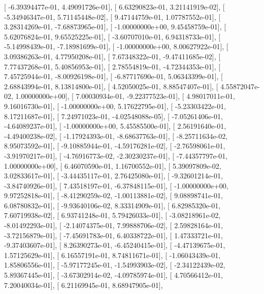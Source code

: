 \documentclass{article}
\begin{document}
       [ -6.39394477e-01,   4.49091726e-01],
       [  6.63290823e-01,   3.21141919e-02],
       [ -5.34946347e-01,   5.71145448e-02],
       [  9.47144759e-01,   1.07787552e-01],
       [  3.28314269e-01,  -7.68873965e-01],
       [ -1.00000000e+00,   9.45458759e-01],
       [  5.62076824e-01,   9.65525225e-01],
       [ -3.60707010e-01,   6.94318733e-01],
       [ -5.14998439e-01,  -7.18981699e-01],
       [ -1.00000000e+00,   8.00627922e-01],
       [  3.09386263e-01,   4.77950208e-01],
       [  7.67348322e-01,  -9.47411685e-02],
       [  7.77437268e-01,   5.40856953e-01],
       [  2.78554819e-01,  -4.72344353e-01],
       [  7.45725944e-01,  -8.00926198e-01],
       [ -6.87717690e-01,   5.06343399e-01],
       [  2.68843994e-01,   8.13814800e-01],
       [  4.52050025e-01,   8.88547407e-01],
       [  4.55872047e-02,   1.00000000e+00],
       [  7.00030934e-01,  -9.22377523e-01],
       [  4.98017011e-01,   9.16016730e-01],
       [ -1.00000000e+00,   5.17622795e-01],
       [ -5.23303422e-01,   8.17211687e-01],
       [  7.24971023e-01,  -4.02548088e-05],
       [ -7.05261406e-01,  -4.64089237e-01],
       [ -1.00000000e+00,   5.45585500e-01],
       [  2.56191640e-01,  -4.49400238e-02],
       [ -1.17924393e-01,  -8.68637763e-01],
       [ -8.25711634e-02,   8.95073592e-01],
       [ -9.10885944e-01,  -4.59176281e-02],
       [ -2.76598061e-01,  -3.91970217e-01],
       [ -4.76916773e-02,  -2.30230237e-01],
       [ -7.44357797e-01,   1.00000000e+00],
       [  6.46070590e-01,   1.16700552e-01],
       [  5.39097809e-02,   3.02833617e-01],
       [ -3.44435117e-01,   2.76425080e-01],
       [ -9.32601214e-01,  -3.84740926e-01],
       [  7.43518197e-01,  -6.37848115e-01],
       [ -1.00000000e+00,   9.97252818e-01],
       [ -8.41290259e-02,  -1.00113881e-02],
       [  9.08898741e-01,   6.08780832e-01],
       [ -9.93640106e-02,   8.33314909e-01],
       [  6.82985320e-01,   7.60719938e-02],
       [  6.93741248e-01,   5.79426033e-01],
       [ -3.08218961e-02,  -8.01492293e-01],
       [ -2.14074375e-01,   7.99888706e-02],
       [  2.59828164e-01,  -3.72156879e-01],
       [ -7.45691783e-01,   6.40338722e-01],
       [  1.47333721e-01,  -9.37403607e-01],
       [  8.26390273e-01,  -6.45240415e-01],
       [ -4.47139675e-01,   1.57125629e-01],
       [  6.16557191e-01,   8.74811671e-01],
       [ -1.06043439e-01,   1.85806556e-01],
       [ -5.97177245e-01,  -1.54993903e-02],
       [ -2.34122439e-02,   5.89367445e-01],
       [ -3.67302914e-02,  -4.09785974e-01],
       [  4.70566412e-01,   7.20040034e-01],
       [  6.21169945e-01,   8.68947905e-01],
\end{document}
